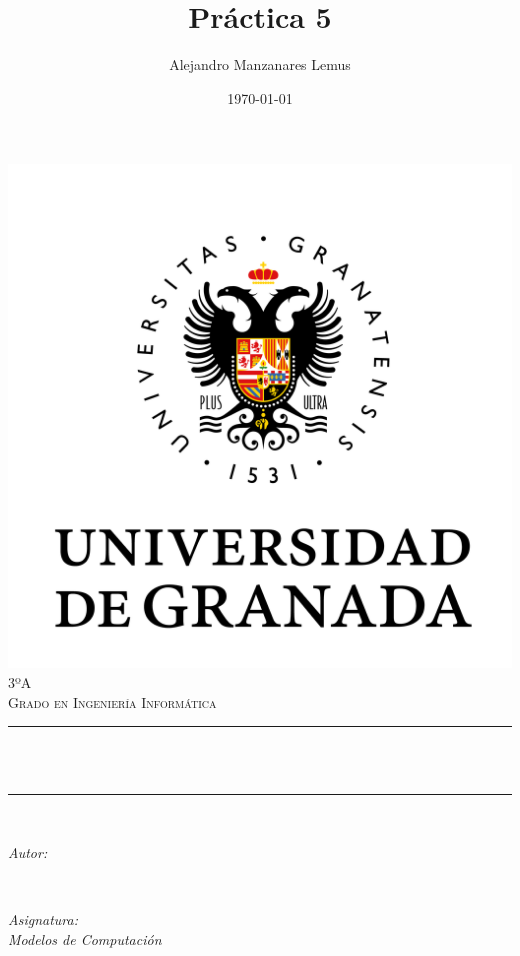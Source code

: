 \documentclass[12pt, spanish]{article}
\title{Práctica 5}
\author{Alejandro Manzanares Lemus }
\date{\today}
\makeatletter
\let\thetitle\@title
\let\theauthor\@author
\let\thedate\@date
\makeatother
\begin{document}
\begin{titlepage}
    \centering
    \vspace*{0.5 cm}
    \includegraphics[scale = 0.50]{UGR.png}\\[1.0 cm]
    \textsc{\large 3ºA}\\[0.5 cm]
    \textsc{\large Grado en Ingeniería Informática}\\[0.5 cm]
    \rule{\linewidth}{0.2 mm} \\[0.4 cm]
    { \huge \bfseries \thetitle}\\
    \rule{\linewidth}{0.2 mm} \\[1.5 cm]

    \begin{minipage}{0.4\textwidth}
        \begin{flushleft} \large
            \emph{Autor:}\\
            \theauthor
            \end{flushleft}
            \end{minipage}~
            \begin{minipage}{0.4\textwidth}
            \begin{flushright} \large
            \emph{Asignatura: \\
            Modelos de Computación}
        \end{flushright}
    \end{minipage}\\[1 cm]

    {\large \thedate}\\[1 cm]

    \vfill

\end{titlepage}
\pagebreak
\end{document}
